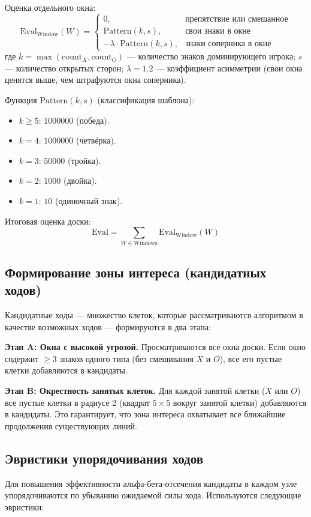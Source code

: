 \documentclass[a4paper,14pt]{extreport}
\begin{document}
Оценка отдельного окна:
\[
\text{Eval}_{\text{Window}}(W) = 
\begin{cases} 
0, & \text{препятствие или смешанное} \\
\text{Pattern}(k, s), & \text{свои знаки в окне} \\
-\lambda \cdot \text{Pattern}(k, s), & \text{знаки соперника в окне}
\end{cases}
\]
где $k = \max(\text{count}_X, \text{count}_O)$ — количество знаков доминирующего игрока; $s$ — количество открытых сторон; $\lambda = 1.2$ — коэффициент асимметрии (свои окна ценятся выше, чем штрафуются окна соперника).

Функция $\text{Pattern}(k, s)$ (классификация шаблона):
\begin{itemize}
    \item $k \ge 5$: $1000000$ (победа).
    \item $k = 4$: $1000000$ (четвёрка).
    \item $k = 3$: $50000$ (тройка).
    \item $k = 2$: $1000$ (двойка).
    \item $k = 1$: $10$ (одиночный знак).
\end{itemize}

Итоговая оценка доски:
\[
\text{Eval} = \sum_{W \in \text{Windows}} \text{Eval}_{\text{Window}}(W)
\]

\subsection{Формирование зоны интереса (кандидатных ходов)}
Кандидатные ходы — множество клеток, которые рассматриваются алгоритмом в качестве возможных ходов — формируются в два этапа:

\textbf{Этап A: Окна с высокой угрозой.} Просматриваются все окна доски. Если окно содержит $\ge 3$ знаков одного типа (без смешивания $X$ и $O$), все его пустые клетки добавляются в кандидаты.

\textbf{Этап B: Окрестность занятых клеток.} Для каждой занятой клетки ($X$ или $O$) все пустые клетки в радиусе 2 (квадрат $5 \times 5$ вокруг занятой клетки) добавляются в кандидаты. Это гарантирует, что зона интереса охватывает все ближайшие продолжения существующих линий.

\subsection{Эвристики упорядочивания ходов}
Для повышения эффективности альфа-бета-отсечения кандидаты в каждом узле упорядочиваются по убыванию ожидаемой силы хода. Используются следующие эвристики:
\end{document}
